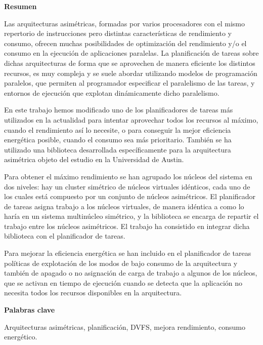 
\cleardoublepage
\thispagestyle{empty}

\begin{center}
  {\bf \Huge Resumen}
\end{center}

Las arquitecturas asimétricas, formadas por varios procesadores con el
mismo repertorio de instrucciones pero distintas características de
rendimiento y consumo, ofrecen muchas posibilidades de optimización del
rendimiento y/o el consumo en la ejecución de aplicaciones paralelas. La
planificación de tareas sobre dichas arquitecturas de forma que se
aprovechen de manera eficiente los distintos recursos, es muy compleja y se
suele abordar utilizando modelos de programación paralelos, que permiten al
programador especificar el paralelismo de las tareas, y entornos de
ejecución que explotan dinámicamente dicho paralelismo.

En este trabajo hemos modificado uno de los planificadores de tareas más
utilizados en la actualidad para intentar aprovechar todos los recursos al
máximo, cuando el rendimiento así lo necesite, o para conseguir la mejor
eficiencia energética posible, cuando el consumo sea más
prioritario. También se ha utilizado una biblioteca desarrollada
específicamente para la arquitectura asimétrica objeto del estudio en la
Universidad de Austin.

Para obtener el máximo rendimiento se han agrupado los núcleos del sistema
en dos niveles: hay un cluster simétrico de núcleos virtuales idénticos,
cada uno de los cuales está compuesto por un conjunto de núcleos
asimétricos. El planificador de tareas asigna trabajo a los núcleos
virtuales, de manera idéntica a como lo haría en un sistema multinúcleo
simétrico, y la biblioteca se encarga de repartir el trabajo entre los
núcleos asimétricos. El trabajo ha consistido en integrar dicha biblioteca
con el planificador de tareas.

Para mejorar la eficiencia energética se han incluido en el planificador de
tareas políticas de explotación de los modos de bajo consumo de la
arquitectura y también de apagado o no asignación de carga de trabajo a
algunos de los núcleos, que se activan en tiempo de ejecución cuando se
detecta que la aplicación no necesita todos los recursos disponibles en la
arquitectura.


\begin{center}
  {\bf \Large Palabras clave}
\end{center}
{
\parindent=0in   
Arquitecturas asimétricas, planificación, DVFS, mejora rendimiento, consumo
energético.
}



